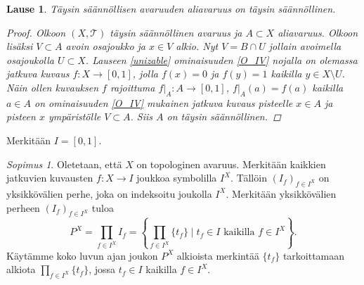 \documentclass[12pt,a4paper,leqno]{report}
\newcommand{\T}{\mathcal{T}}
\theoremstyle{plain}
\newtheorem{lause}[equation]{Lause}
\theoremstyle{definition}
\theoremstyle{remark}
\newtheorem{sopimus}[equation]{Sopimus}
\begin{document}
\begin{lause}
Täysin säännöllisen avaruuden aliavaruus on täysin säännöllinen.
\begin{proof}
Olkoon $(X,\T)$ täysin säännöllinen avaruus ja $A\subset X$ aliavaruus. 
Olkoon lisäksi $V\subset A$ avoin osajoukko ja $x\in V$ alkio. 
Nyt $V=B\cap U$ jollain avoimella osajoukolla $U\subset X$. 
Lauseen \ref{unizable} ominaisuuden \ref{O_IV} nojalla on olemassa 
jatkuva kuvaus $f\colon X\rightarrow [0,1]$, jolla $f(x)=0$ ja $ f(y)=1$ kaikilla $y\in X\setminus U$. 
Näin ollen kuvauksen $f$ rajoittuma 
$f\vert_A\colon A\rightarrow [0,1]$, $f\vert_A(a)= f(a)$ 
kaikilla $a\in A$ on ominaisuuden \ref{O_IV} mukainen jatkuva kuvaus 
pisteelle $x\in A$ ja pisteen $x$ ympäristölle $V\subset A$. 
Siis $A$ on täysin säännöllinen. 
\end{proof}
\end{lause}

Merkitään $I=[0,1]$.

\begin{sopimus}
Oletetaan, että $X$ on topologinen avaruus. 
Merkitään kaikkien jatkuvien 
kuvausten $f\colon X\rightarrow I$ joukkoa symbolilla $I^X$. 
Tällöin $(I_f)_{f\in I^X}$ on yksikkövälien perhe, 
joka on indeksoitu joukolla $I^X$. 
Merkitään yksikkövälien perheen $(I_f)_{f\in I^X}$ tuloa 
$$P^X=\prod_{f\in I^X}I_f
=\left\{\prod_{f\in I^X}\{t_f\}\mid t_f\in I \text{ kaikilla } f\in I^X\right\}
.$$
Käytämme koko luvun ajan joukon $P^X$ alkioista merkintää $\{t_f\}$ tarkoittamaan alkiota $\prod_{f\in I^X}\{t_f\}$, jossa $t_f\in I$ kaikilla $f\in I^X$.
\end{sopimus}
\end{document}
